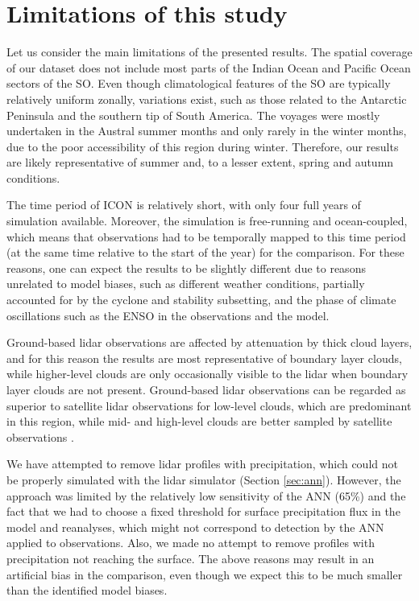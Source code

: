 \documentclass[draft]{agujournal2019}
\begin{document}
\section{Limitations of this study}

Let us consider the main limitations of the presented results. The spatial coverage of our dataset does not include most parts of the Indian Ocean and Pacific Ocean sectors of the SO. Even though climatological features of the SO are typically relatively uniform zonally, variations exist, such as those related to the Antarctic Peninsula and the southern tip of South America. The voyages were mostly undertaken in the Austral summer months and only rarely in the winter months, due to the poor accessibility of this region during winter. Therefore, our results are likely representative of summer and, to a lesser extent, spring and autumn conditions.

The time period of ICON is relatively short, with only four full years of simulation available. Moreover, the simulation is free-running and ocean-coupled, which means that observations had to be temporally mapped to this time period (at the same time relative to the start of the year) for the comparison. For these reasons, one can expect the results to be slightly different due to reasons unrelated to model biases, such as different weather conditions, partially accounted for by the cyclone and stability subsetting, and the phase of climate oscillations such as the ENSO in the observations and the model.

Ground-based lidar observations are affected by attenuation by thick cloud layers, and for this reason the results are most representative of boundary layer clouds, while higher-level clouds are only occasionally visible to the lidar when boundary layer clouds are not present. Ground-based lidar observations can be regarded as superior to satellite lidar observations for low-level clouds, which are predominant in this region, while mid- and high-level clouds are better sampled by satellite observations .

We have attempted to remove lidar profiles with precipitation, which could not be properly simulated with the lidar simulator (Section \ref{sec:ann}). However, the approach was limited by the relatively low sensitivity of the ANN (65\%) and the fact that we had to choose a fixed threshold for surface precipitation flux in the model and reanalyses, which might not correspond to detection by the ANN applied to observations. Also, we made no attempt to remove profiles with precipitation not reaching the surface. The above reasons may result in an artificial bias in the comparison, even though we expect this to be much smaller than the identified model biases.
\end{document}
